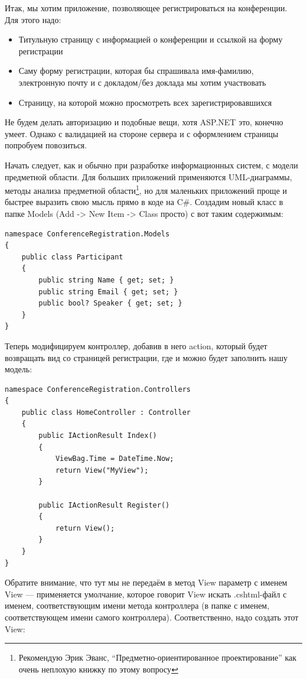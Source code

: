 \documentclass[a5paper]{article}
\begin{document}
Итак, мы хотим приложение, позволяющее регистрироваться на конференции. Для этого надо:
\begin{itemize}
    \item Титульную страницу с информацией о конференции и ссылкой на форму регистрации
    \item Саму форму регистрации, которая бы спрашивала имя-фамилию, электронную почту и с докладом/без доклада мы хотим участвовать
    \item Страницу, на которой можно просмотреть всех зарегистрировавшихся
\end{itemize}

Не будем делать авторизацию и подобные вещи, хотя ASP.NET это, конечно умеет. Однако с валидацией на стороне сервера и с оформлением страницы попробуем повозиться.

Начать следует, как и обычно при разработке информационных систем, с модели предметной области. Для больших приложений применяются UML-диаграммы, методы анализа предметной области\footnote{Рекомендую Эрик Эванс, ``Предметно-ориентированное проектирование'' как очень неплохую книжку по этому вопросу},
но для маленьких приложений проще и быстрее выразить свою мысль прямо в коде на C\#. Создадим новый класс в папке Models (Add -> New Item -> Class просто) с вот таким содержимым:

\begin{verbatim}
namespace ConferenceRegistration.Models
{
    public class Participant
    {
        public string Name { get; set; }
        public string Email { get; set; }
        public bool? Speaker { get; set; }
    }
}
\end{verbatim}

Теперь модифицируем контроллер, добавив в него action, который будет возвращать вид со страницей регистрации, где и можно будет заполнить нашу модель:

\begin{verbatim}
namespace ConferenceRegistration.Controllers
{
    public class HomeController : Controller
    {
        public IActionResult Index()
        {
            ViewBag.Time = DateTime.Now;
            return View("MyView");
        }

        public IActionResult Register()
        {
            return View();
        }
    }
}
\end{verbatim}

Обратите внимание, что тут мы не передаём в метод View параметр с именем View --- применяется умолчание, которое говорит View искать .cshtml-файл с именем, соответствующим имени метода контроллера (в папке с именем, соответствующем имени самого контроллера).
Соответственно, надо создать этот View:
\end{document}
